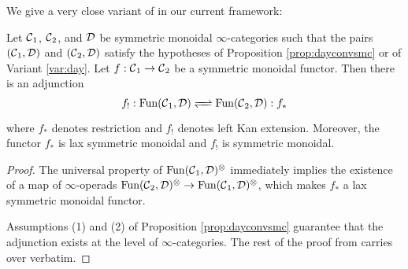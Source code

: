 We give a very close variant of \cite[Corollary 3.8]{Nikolaus} in our current framework:

\begin{prop}\label{prop:kanmonoidal}
Let $\operatorname{\mathcal{C}}_1$, $\operatorname{\mathcal{C}}_2$, and $\operatorname{\mathcal{D}}$ be symmetric monoidal $\infty$-categories such that the pairs $(\operatorname{\mathcal{C}}_1, \operatorname{\mathcal{D}})$ and $(\operatorname{\mathcal{C}}_2, \operatorname{\mathcal{D}})$ satisfy the hypotheses of Proposition \ref{prop:dayconvsmc} or of Variant \ref{var:day}.  Let $f:\operatorname{\mathcal{C}}_1 \to \operatorname{\mathcal{C}}_2$ be a symmetric monoidal functor.  Then there is an adjunction 
$$ f_! : \Fun(\C_1, \D) \xrightleftharpoons{\quad} \Fun(\C_2, \D): f_* $$ %
where $f_*$ denotes restriction and $f_!$ denotes left Kan extension.  Moreover, the functor $f_*$ is lax symmetric monoidal and $f_!$ is symmetric monoidal.  
\end{prop}
\begin{proof}
The universal property of $\operatorname{\text{Fun}}(\operatorname{\mathcal{C}}_1, \operatorname{\mathcal{D}})^{\otimes}$ immediately implies the existence of a map of $\infty$-operads $\operatorname{\text{Fun}}(\operatorname{\mathcal{C}}_2,\operatorname{\mathcal{D}})^{\otimes} \to \operatorname{\text{Fun}}(\operatorname{\mathcal{C}}_1,\operatorname{\mathcal{D}})^{\otimes}$, which makes $f_*$ a lax symmetric monoidal functor.  

Assumptions (1) and (2) of Proposition \ref{prop:dayconvsmc} guarantee that the adjunction exists at the level of $\infty$-categories.  The rest of the proof from \cite[Corollary 3.8]{Nikolaus} carries over verbatim.  
\end{proof}



